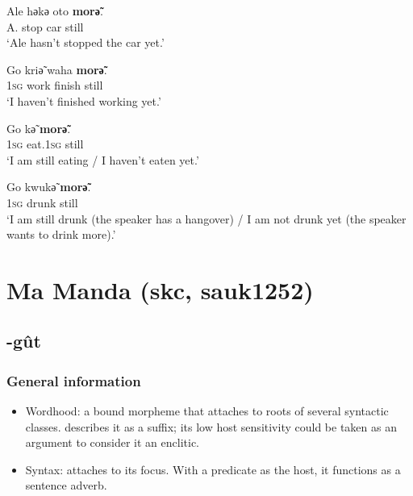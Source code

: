 \begin{exe}
	\ex\label{exAppendixLewotobiNotYet1}
	\gll Ale hәkә oto \textbf{morә̃}.\\
	A. stop car still\\
	\glt \lq Ale hasn’t stopped the car yet.'  \parencite[415]{Nagaya2012}

	\ex\label{exAppendixLewotobiNotYet2}
	\gll Go kriә̃ waha \textbf{morә̃}.\\
	1\textsc{sg} work finish still\\
	\glt \lq I haven’t finished working yet.' \parencite[415]{Nagaya2012}
	
	\ex\label{exAppendixLewotobiNotYet3}
	\gll Go kә̃ \textbf{morә̃}.\\
	1\textsc{sg} eat.1\textsc{sg} still\\
	\glt \lq I am still eating / I haven’t eaten yet.'  \parencite[416]{Nagaya2012}

	\ex\label{exAppendixLewotobiNotYet4}
	\gll  Go kwukә̃ \textbf{morә̃}.\\
	1\textsc{sg} drunk still\\
	\glt \lq I am still drunk (the speaker has a hangover) / I am not drunk yet (the speaker wants to drink more).' \parencite[416]{Nagaya2012}
\end{exe}

\section{Ma Manda (skc, sauk1252)}
\label{appendixMaManda}

\subsection{-gût}

\subsubsection{General information}
\begin{itemize}
	\sloppy
	\item Wordhood: a bound morpheme that attaches to roots of several syntactic classes. \textcite{Pennington2016} describes it as a suffix; its low host sensitivity could be taken as an argument to consider it an enclitic.
	\item Syntax: attaches to its focus. With a predicate as the host, it functions as a sentence adverb.
\end{itemize}

